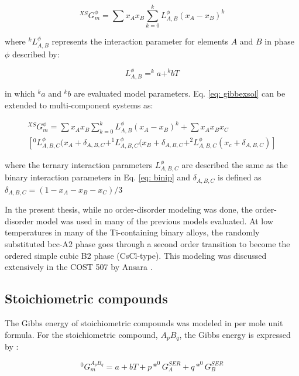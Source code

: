 \begin{equation}
\label{eq: gibbexsol}
^{XS}G_m^{\phi} = \sum x_{A} x_{B} \sum_{k=0} ^{k}L_{A,B}^{\phi} (x_{A} - x_{B})^k
\end{equation}

\noindent where $^kL_{A,B}^{\phi}$ represents the interaction parameter for elements $A$ and $B$ in phase $\phi$ described by:

\begin{equation}
\label{eq: binip}
L_{A,B}^{\phi} = ^{k}a + ^{k}bT
\end{equation}

\noindent in which $^{k}a$ and $^{k}b$ are evaluated model parameters. Eq. \ref{eq: gibbexsol} can be extended to multi-component systems as:

\begin{multline}
\label{eq: gibbexsolmulti}
^{XS}G_m^{\phi} = \sum x_{A} x_{B} \sum_{k=0} ^{k}L_{A,B}^{\phi} (x_{A} - x_{B})^k + \sum x_{A} x_{B} x_{C} \\ \left[ ^{0}L_{A, B, C}^{\phi} (x_{A} + \delta_{A, B, C} + ^{1}L_{A, B, C}^{\phi} (x_{B} + \delta_{A, B, C} + ^{2}L_{A, B, C}^{\phi} (x_{c} + \delta_{A, B, C} ) \right]
\end{multline}

\noindent where the ternary interaction parameters $L_{A, B, C}^{\phi}$ are described the same as the binary interaction parameters in Eq. \ref{eq: binip} and $\delta_{A, B, C}$ is defined as $\delta_{A, B, C} = ( 1 - x_{A} - x_{B} - x_{C})/3$

In the present thesis, while no order-disorder modeling was done, the order-disorder model was used in many of the previous models evaluated. At low temperatures in many of the Ti-containing binary alloys, the randomly substituted bcc-A2 phase goes through a second order transition to become the ordered simple cubic B2 phase (CsCl-type). This modeling was discussed extensively in the COST 507 by Ansara \cite{Ansara1998}. 

\subsection{Stoichiometric compounds}

The Gibbs energy of stoichiometric compounds was modeled in per mole unit formula. For the stoichiometric compound, $A_{p}B_{q}$, the Gibbs energy is expressed by \cite{Zacherl2012}: 

\begin{equation}
\label{eq: stoichiometric}
^{0}G_{m}^{A_{p}B_{q}} = a + bT + p * ^{0}G_{A}^{SER} + q * ^{0}G_{B}^{SER}
\end{equation}

